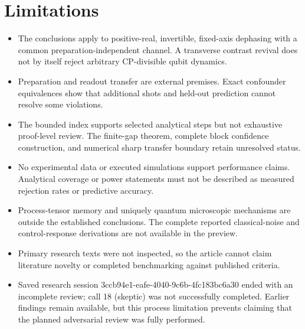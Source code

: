 \documentclass[11pt]{article}
\begin{document}
\section{Limitations}
\begin{itemize}
\item The conclusions apply to positive-real, invertible, fixed-axis dephasing with a common preparation-independent channel. A transverse contrast revival does not by itself reject arbitrary CP-divisible qubit dynamics.
\item Preparation and readout transfer are external premises. Exact confounder equivalences show that additional shots and held-out prediction cannot resolve some violations.
\item The bounded index supports selected analytical steps but not exhaustive proof-level review. The finite-gap theorem, complete block confidence construction, and numerical sharp transfer boundary retain unresolved status.
\item No experimental data or executed simulations support performance claims. Analytical coverage or power statements must not be described as measured rejection rates or predictive accuracy.
\item Process-tensor memory and uniquely quantum microscopic mechanisms are outside the established conclusions. The complete reported classical-noise and control-response derivations are not available in the preview.
\item Primary research texts were not inspected, so the article cannot claim literature novelty or completed benchmarking against published criteria.
\item Saved research session 3ccb94e1-eafe-4040-9c6b-4fc183bc6a30 ended with an incomplete review; call 18 (skeptic) was not successfully completed. Earlier findings remain available, but this process limitation prevents claiming that the planned adversarial review was fully performed.
\end{itemize}
\end{document}
